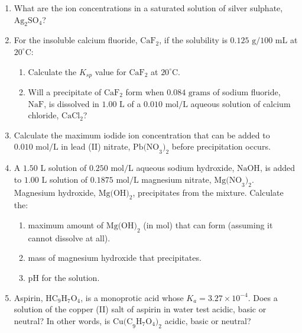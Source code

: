 \documentclass[12pt]{article}
\begin{document}
\begin{enumerate}[label=\arabic*.]
    \item What are the ion concentrations in a saturated solution of silver sulphate, $\text{Ag}_2\text{SO}_4$?
    \vspace{3cm}

    \item For the insoluble calcium fluoride, $\text{CaF}_2$, if the solubility is $0.125\text{ g}/100\text{ mL}$ at $20^\circ\text{C}$:
    \begin{enumerate}[label=\alph*)]
        \item Calculate the $K_{sp}$ value for $\text{CaF}_2$ at $20^\circ\text{C}$.
        \vspace{3cm}
        \item Will a precipitate of $\text{CaF}_2$ form when $0.084\text{ grams}$ of sodium fluoride, $\text{NaF}$, is dissolved in $1.00\text{ L}$ of a $0.010\text{ mol/L}$ aqueous solution of calcium chloride, $\text{CaCl}_2$?
        \vspace{3.5cm}
    \end{enumerate}

    \item Calculate the maximum iodide ion concentration that can be added to $0.010\text{ mol/L}$ in lead (II) nitrate, $\text{Pb(NO}_3)_2$ before precipitation occurs.
    \vspace{3.5cm}

    \item A $1.50\text{ L}$ solution of $0.250\text{ mol/L}$ aqueous sodium hydroxide, $\text{NaOH}$, is added to $1.00\text{ L}$ solution of $0.1875\text{ mol/L}$ magnesium nitrate, $\text{Mg(NO}_3)_2$. Magnesium hydroxide, $\text{Mg(OH)}_2$, precipitates from the mixture. Calculate the:
    \begin{enumerate}[label=\alph*)]
        \item maximum amount of $\text{Mg(OH)}_2$ (in mol) that can form (assuming it cannot dissolve at all).
        \vspace{3cm}
        \item mass of magnesium hydroxide that precipitates.
        \vspace{2.5cm}
        \item pH for the solution.
        \vspace{3.5cm}
    \end{enumerate}

    \item Aspirin, $\text{HC}_9\text{H}_7\text{O}_4$, is a monoprotic acid whose $K_a = 3.27 \times 10^{-4}$. Does a solution of the copper (II) salt of aspirin in water test acidic, basic or neutral? In other words, is $\text{Cu(C}_9\text{H}_7\text{O}_4)_2$ acidic, basic or neutral?
    \vspace{3.5cm}


\end{enumerate}
\end{document}
